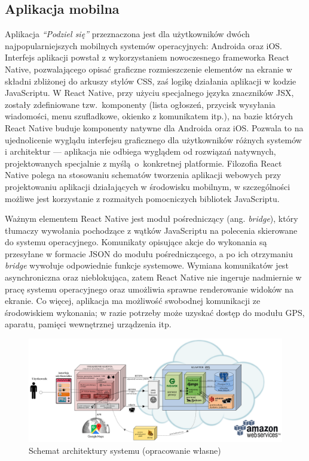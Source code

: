 \documentclass[licencjacka]{pracamgr}
\begin{document}
\subsection{Aplikacja mobilna}
Aplikacja \textit{``Podziel się''} przeznaczona jest dla użytkowników dwóch najpopularniejszych mobilnych systemów operacyjnych: Androida oraz iOS\@. Interfejs aplikacji powstał z wykorzystaniem nowoczesnego frameworka React Native, pozwalającego opisać graficzne rozmieszczenie elementów na ekranie w składni zbliżonej do arkuszy stylów CSS, zaś logikę działania aplikacji w kodzie JavaScriptu. W React Native, przy użyciu specjalnego języka znaczników JSX, zostały zdefiniowane tzw.\ komponenty (lista ogłoszeń, przycisk wysyłania wiadomości, menu szufladkowe, okienko z komunikatem itp.), na bazie których React Native buduje komponenty natywne dla Androida oraz iOS\@. Pozwala to na ujednolicenie wyglądu interfejsu graficznego dla użytkowników różnych systemów i architektur --- aplikacja nie odbiega wyglądem od rozwiązań natywnych, projektowanych specjalnie z myślą~o~konkretnej platformie. Filozofia React Native polega na stosowaniu schematów tworzenia aplikacji webowych przy projektowaniu aplikacji działających w środowisku mobilnym, w szczególności możliwe jest korzystanie z rozmaitych pomocniczych bibliotek JavaScriptu.

Ważnym elementem React Native jest moduł pośredniczący (ang. \textit{bridge}), który tłumaczy wywołania pochodzące z wątków JavaScriptu na polecenia skierowane do systemu operacyjnego. Komunikaty opisujące akcje do wykonania są przesyłane w formacie JSON do modułu pośredniczącego, a po ich otrzymaniu \textit{bridge} wywołuje odpowiednie funkcje systemowe. Wymiana komunikatów jest asynchroniczna oraz nieblokująca, zatem React Native nie ingeruje nadmiernie w pracę systemu operacyjnego oraz umożliwia sprawne renderowanie widoków na ekranie. Co więcej, aplikacja ma możliwość swobodnej komunikacji ze środowiskiem wykonania; w razie potrzeby może uzyskać dostęp do modułu GPS, aparatu, pamięci wewnętrznej urządzenia itp.

\newpage
\begin{figure}[H]
  \centering
  \includegraphics[angle=90, width=\textwidth,height=\textheight, keepaspectratio]{architekturakolor.png}
  \caption{Schemat architektury systemu (opracowanie własne)}
\end{figure}
\end{document}
